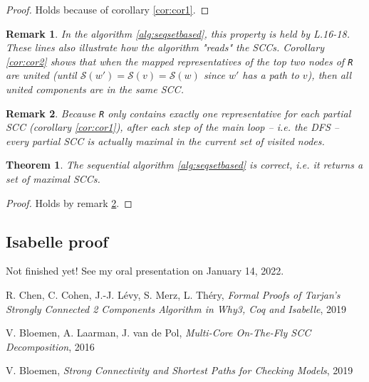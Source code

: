 \documentclass[a4 paper, 12pt]{article}
\newtheorem{theorem}{Theorem}
\newtheorem{remark}{Remark}
\begin{document}
\begin{proof}
    Holds because of corollary \ref{cor:cor1}.
\end{proof}

\begin{remark}
    In the algorithm \ref{alg:seqsetbased}, this property is held by L.16-18. These lines also illustrate how the algorithm "reads" the SCCs. Corollary \ref{cor:cor2} shows that when the mapped representatives of the top two nodes of \texttt{R} are united (until $\mathcal{S}(w') = \mathcal{S}(v) = \mathcal{S}(w)$ since $w'$ has a path to $v$), then all united components are in the same SCC.
\end{remark}

\begin{remark}\label{rem:proof}
    Because \texttt{R} only contains exactly one representative for each partial SCC (corollary \ref{cor:cor1}), after each step of the main loop -- \textit{i.e.} the DFS -- every partial SCC is actually maximal in the current set of visited nodes.
\end{remark}

\begin{theorem}
    The sequential algorithm \ref{alg:seqsetbased} is correct, \textit{i.e.} it returns a set of maximal SCCs.
\end{theorem}
\begin{proof}
    Holds by remark \ref{rem:proof}.
\end{proof}

\pagebreak

\subsection{Isabelle proof}
Not finished yet! See my oral presentation on January 14, 2022.
\pagebreak

\begin{thebibliography}{99}

 R. Chen, C. Cohen, J.-J. Lévy, S. Merz, L. Théry, \emph{Formal Proofs of Tarjan’s Strongly Connected 2 Components Algorithm in Why3, Coq and Isabelle}, 2019

 V. Bloemen, A. Laarman, J. van de Pol, \emph{Multi-Core On-The-Fly SCC Decomposition}, 2016

 V. Bloemen, \emph{Strong Connectivity and Shortest Paths for Checking Models}, 2019

\end{thebibliography}
\end{document}
